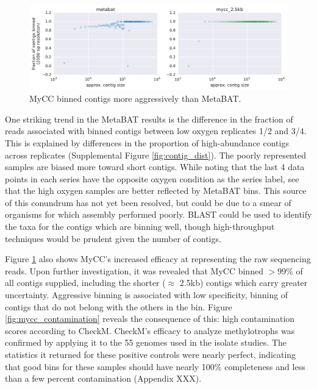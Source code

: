 \begin{figure}[H]
\centering
    \includegraphics[width=1.0\textwidth]{./tex/chapter2/figures/170206_improved_fracs_of_contigs_binned_by_MyCC.pdf}
    \begin{singlespace}
    \caption[MyCC binned contigs more aggressively than MetaBAT]{
        MyCC binned contigs more aggressively than MetaBAT.}
    \label{fig:mycc_binned_more_contigs}
    \end{singlespace}
\end{figure}

One striking trend in the MetaBAT results is the difference in the fraction of reads associated with binned contigs between low oxygen replicates 1/2 and 3/4.
This is explained by differences in the proportion of high-abundance contigs across replicates (Supplemental Figure \ref{fig:contig_dist}).
The poorly represented samples are biased more toward short contigs.
While noting that the last 4 data points in each series have the opposite oxygen condition as the series label, see that the high oxygen samples are better reflected by MetaBAT bins.
This source of this conundrum has not yet been resolved, but could be due to a smear of organisms for which assembly performed poorly.
BLAST could be used to identify the taxa for the contigs which are binning well, though high-throughput techniques would be prudent given the number of contigs.

Figure \ref{fig:mycc_binned_more_contigs} also shows MyCC's increased efficacy at representing the raw sequencing reads.
Upon further investigation, it was revealed that MyCC binned $>$99\% of all contigs supplied, including the shorter ($\approx$ 2.5kb) contigs which carry greater uncertainty. %
Aggressive binning is associated with low specificity, binning of contigs that do not belong with the others in the bin.
Figure \ref{fig:mycc_contamination} reveals the consequence of this: high contamination scores according to CheckM.
CheckM's efficacy to analyze methylotrophs was confirmed by applying it to the 55 genomes used in the isolate studies.
The statistics it returned for these positive controls were nearly perfect, indicating that good bins for these samples should have nearly 100\% completeness and less than a few percent contamination (Appendix XXX).

